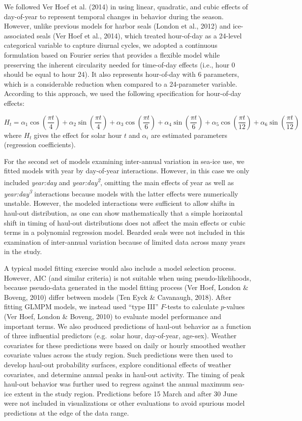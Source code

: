 \documentclass[fleqn,10pt,lineno]{wlpeerj} %
\begin{document}
We followed Ver Hoef et al. (2014) in using linear, quadratic, and cubic
effects of day-of-year to represent temporal changes
in behavior during the season. However, unlike previous models for harbor seals
(London et al., 2012) and ice-associated seals (Ver Hoef et al., 2014), which treated
hour-of-day as a 24-level categorical variable to capture diurnal cycles, we
adopted a continuous formulation based on Fourier series that provides a
flexible model while preserving the inherent circularity needed for time-of-day
effects (i.e., hour 0 should be equal to hour 24). It also represents
hour-of-day with 6 parameters, which is a considerable reduction when compared
to a 24-parameter variable. According to this approach, we used the following
specification for hour-of-day effects:

\[
H_t=\alpha_1 \cos(\frac{\pi t}{4}) + \alpha_2 \sin(\frac{\pi t}{4}) + \alpha_3 \cos(\frac{\pi t}{6}) + \alpha_4 \sin(\frac{\pi t}{6}) + \alpha_5 \cos(\frac{\pi t}{12}) + \alpha_6 \sin(\frac{\pi t}{12})
\]
where \(H_t\) gives the effect for solar hour \(t\) and \(\alpha_{i}\) are
estimated parameters (regression coefficients).

For the second set of models examining inter-annual variation in sea-ice use, we
fitted models with year by day-of-year interactions. However, in this case we
only included \emph{year:day} and \emph{year:day\textsuperscript{2}}, omitting the main effects of year as
well as \emph{year:day\textsuperscript{3}} interactions because models with the latter effects were
numerically unstable. However, the modeled interactions were sufficient to allow
shifts in haul-out distribution, as one can show mathematically that a simple
horizontal shift in timing of haul-out distributions does not affect the main
effects or cubic terms in a polynomial regression model. Bearded seals were
not included in this examination of inter-annual variation because of limited
data across many years in the study.

A typical model fitting exercise would also include a model selection process.
However, AIC (and similar criteria) is not suitable when using
pseudo-likelihoods, because pseudo-data generated in the model fitting process
(Ver Hoef, London \& Boveng, 2010) differ between models (Ten Eyck \& Cavanaugh, 2018). After fitting GLMPM
models, we instead used ``type III'' \(F\)-tests to calculate \(p\)-values
(Ver Hoef, London \& Boveng, 2010) to evaluate model performance and important terms. We also
produced predictions of haul-out behavior as a function of three influential
predictors (e.g.~solar hour, day-of-year, age-sex). Weather covariates for these
predictions were based on daily or hourly smoothed weather covariate values
across the study region. Such predictions were then used to develop haul-out
probability surfaces, explore conditional effects of weather covariates, and
determine annual peaks in haul-out activity. The timing of peak haul-out
behavior was further used to regress against the annual maximum sea-ice extent
in the study region. Predictions before 15 March and after 30 June were not
included in visualizations or other evaluations to avoid spurious model
predictions at the edge of the data range.
\end{document}
